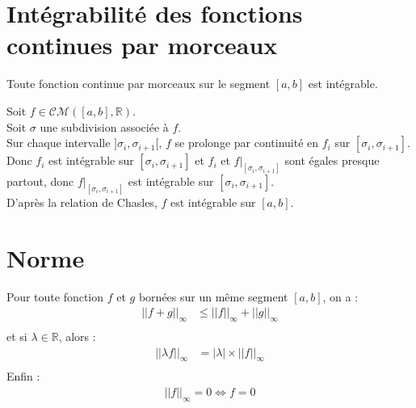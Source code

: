 \documentclass[../main.tex]{subfiles}
\begin{document}
\section{Intégrabilité des fonctions continues par morceaux}
\begin{tcolorbox}[title=Théorème 26.58, title filled=false, colframe=orange, colback=orange!10!white]
    Toute fonction continue par morceaux sur le segment $[a, b]$ est intégrable. 
\end{tcolorbox}

\noindent Soit $f\in \mathcal{CM}([a, b], \mathbb{R})$. \\
Soit $\sigma$ une subdivision associée à $f$. \\
Sur chaque intervalle $]\sigma_i, \sigma_{i+1}[$, $f$ se prolonge par continuité en $f_i$ sur $[\sigma_i, \sigma_{i+1}]$. \\
Donc $f_i$ est intégrable sur $[\sigma_i, \sigma_{i+1}]$ et $f_i$ et $\left. f\right|_{[\sigma_i, \sigma_{i+1}]}$ sont égales presque partout, donc $\left. f\right|_{[\sigma_i, \sigma_{i+1}]}$ est intégrable sur $[\sigma_i, \sigma_{i+1}]$. \\
D'après la relation de Chasles, $f$ est intégrable sur $[a, b]$. 

\section{Norme}
\begin{tcolorbox}[title=Propostion 26.61, title filled=false, colframe=lightblue, colback=lightblue!10!white]
    Pour toute fonction $f$ et $g$ bornées sur un même segment $[a, b]$, on a : 
    \begin{align*}
        ||f + g||_{\infty} &\leq ||f||_{\infty} + ||g||_{\infty} \\
    \end{align*}
    et si $\lambda \in \mathbb{R}$, alors : 
    \begin{align*}
        ||\lambda f||_{\infty} &= |\lambda| \times ||f||_{\infty} \\
    \end{align*}
    Enfin : 
    \begin{align*}
        ||f||_{\infty} = 0 \Leftrightarrow f = 0
    \end{align*}
\end{tcolorbox}
\end{document}
